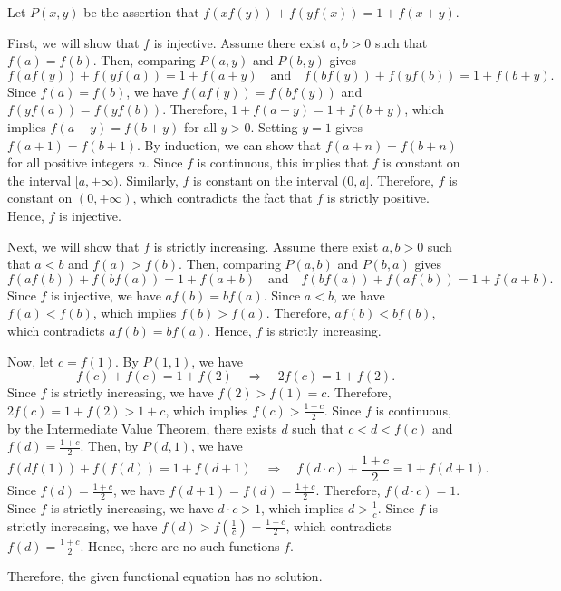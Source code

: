 Let \( P(x,y) \) be the assertion that \( f(xf(y)) + f(yf(x)) = 1 + f(x+y) \).

First, we will show that \( f \) is injective. Assume there exist \( a,b > 0 \) such that \( f(a) = f(b) \). Then, comparing \( P(a,y) \) and \( P(b,y) \) gives
\[
f(af(y)) + f(yf(a)) = 1 + f(a+y) \quad \text{and} \quad f(bf(y)) + f(yf(b)) = 1 + f(b+y).
\]
Since \( f(a) = f(b) \), we have \( f(af(y)) = f(bf(y)) \) and \( f(yf(a)) = f(yf(b)) \). Therefore, \( 1 + f(a+y) = 1 + f(b+y) \), which implies \( f(a+y) = f(b+y) \) for all \( y > 0 \). Setting \( y = 1 \) gives \( f(a+1) = f(b+1) \). By induction, we can show that \( f(a+n) = f(b+n) \) for all positive integers \( n \). Since \( f \) is continuous, this implies that \( f \) is constant on the interval \([a,+\infty)\). Similarly, \( f \) is constant on the interval \((0,a]\). Therefore, \( f \) is constant on \((0,+\infty)\), which contradicts the fact that \( f \) is strictly positive. Hence, \( f \) is injective.

Next, we will show that \( f \) is strictly increasing. Assume there exist \( a,b > 0 \) such that \( a < b \) and \( f(a) > f(b) \). Then, comparing \( P(a,b) \) and \( P(b,a) \) gives
\[
f(af(b)) + f(bf(a)) = 1 + f(a+b) \quad \text{and} \quad f(bf(a)) + f(af(b)) = 1 + f(a+b).
\]
Since \( f \) is injective, we have \( af(b) = bf(a) \). Since \( a < b \), we have \( f(a) < f(b) \), which implies \( f(b) > f(a) \). Therefore, \( af(b) < bf(b) \), which contradicts \( af(b) = bf(a) \). Hence, \( f \) is strictly increasing.

Now, let \( c = f(1) \). By \( P(1,1) \), we have
\[
f(c) + f(c) = 1 + f(2) \quad \Rightarrow \quad 2f(c) = 1 + f(2).
\]
Since \( f \) is strictly increasing, we have \( f(2) > f(1) = c \). Therefore, \( 2f(c) = 1 + f(2) > 1 + c \), which implies \( f(c) > \frac{1+c}{2} \). Since \( f \) is continuous, by the Intermediate Value Theorem, there exists \( d \) such that \( c < d < f(c) \) and \( f(d) = \frac{1+c}{2} \). Then, by \( P(d,1) \), we have
\[
f(df(1)) + f(f(d)) = 1 + f(d+1) \quad \Rightarrow \quad f(d\cdot c) + \frac{1+c}{2} = 1 + f(d+1).
\]
Since \( f(d) = \frac{1+c}{2} \), we have \( f(d+1) = f(d) = \frac{1+c}{2} \). Therefore, \( f(d\cdot c) = 1 \). Since \( f \) is strictly increasing, we have \( d\cdot c > 1 \), which implies \( d > \frac{1}{c} \). Since \( f \) is strictly increasing, we have \( f(d) > f\left(\frac{1}{c}\right) = \frac{1+c}{2} \), which contradicts \( f(d) = \frac{1+c}{2} \). Hence, there are no such functions \( f \).

Therefore, the given functional equation has no solution.
